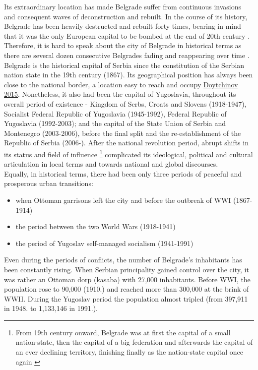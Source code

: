 \documentclass[11pt]{report}
\begin{document}
Its extraordinary location has made Belgrade suffer from continuous invasions and consequent waves of deconstruction and rebuilt. In the course of its history, Belgrade has been heavily destructed and rebuilt forty times, bearing in mind that it was the only European capital to be bombed at the end of 20th century \href{}{\citealt{doytchinov_belgrade_2015}}. Therefore, it is hard to speak about the city of Belgrade in historical terms as there are several  dozen  consecutive  Belgrades fading and reappearing over time \href{}{\citealt{grozdanic_belgrade_2008}}.
\\
Belgrade is the historical capital of Serbia since the constitution of the Serbian nation state in the 19th century (1867). Its geographical position has always been close to the national border, a location easy to reach and occupy \href{}{Doytchinov 2015}.
Nonetheless, it also had been the capital of Yugoslavia, throughout its overall period of existence - Kingdom of Serbs, Croats and Slovens (1918-1947), Socialist Federal Republic of Yugoslavia (1945-1992), Federal Republic of Yugoslavia (1992-2003); and the capital of the State Union of Serbia and Montenegro (2003-2006), before the final split and the re-establishment of the Republic of Serbia (2006-). After the national revolution period, abrupt shifts in its status and field of influence
\footnote{From 19th century onward, Belgrade was at first the capital of a small nation-state, then the capital of a big federation and afterwards the capital of an ever declining territory, finishing finally as the nation-state capital once again \href{}{\citealt{hirt_belgrade_2009}}}
complicated its ideological, political and cultural articulation in local terms and towards national and global discourses.
\\

Equally, in historical terms, there had been only three periods of peaceful and prosperous urban transitions:

\begin{itemize}
\item when Ottoman garrisons left the city and before the outbreak of WWI (1867-1914)
\item the period between the two World Wars (1918-1941)
\item  the period of Yugoslav self-managed socialism (1941-1991)
\end{itemize}

Even during the periods of conflicts, the number of Belgrade's inhabitants has been constantly rising. When Serbian principality gained control over the city, it was rather an Ottoman dorp (kasaba) with 27,000 inhabitants. Before WWI, the population rose to 90,000 (1910.) and reached more than 300,000 at the brink of WWII.
During the Yugoslav period the population almost tripled (from 397,911 in 1948. to 1,133,146 in 1991.).
\\
\end{document}
